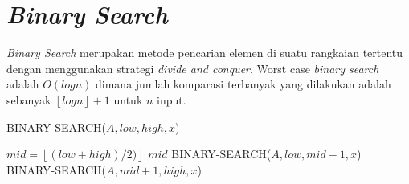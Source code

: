\section{\textit{Binary Search}}

\textit{Binary Search} merupakan metode pencarian elemen di suatu rangkaian tertentu dengan menggunakan strategi \textit{divide and conquer}. Worst case \textit{binary search} adalah $O(log n)$ dimana jumlah komparasi terbanyak yang dilakukan adalah sebanyak $\left\lfloor log n \right\rfloor + 1$ untuk $n$ input.

\begin{algorithm}[H]
	\caption{BINARY-SEARCH($A,low,high,x$)}
	\begin{algorithmic}[1]
		\ELSE
			\STATE $mid = \left\lfloor(low+high)/2)\right\rfloor$
				\RETURN $mid$
				\RETURN BINARY-SEARCH($A,low,mid-1,x$) 
			\ELSE
				\RETURN BINARY-SEARCH($A,mid+1,high,x$)
			\ENDIF
		\ENDIF
	\end{algorithmic}
\end{algorithm}

